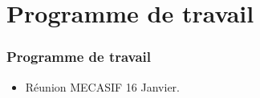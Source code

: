 \documentclass[12pt]{beamer}
\begin{document}

%
%	
%	

%
%	
%		
%	
	
\section{Programme de travail}

	\begin{frame}
	
		\frametitle{Programme de travail}
		
		\begin{itemize}
			\item Réunion MECASIF 16 Janvier.
		\end{itemize}
	
	\end{frame}
\end{document}
